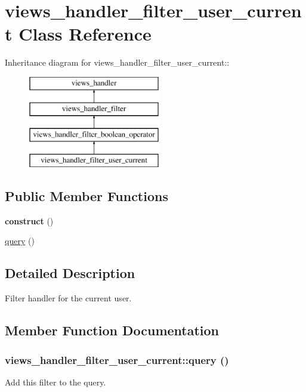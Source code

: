 \hypertarget{classviews__handler__filter__user__current}{
\section{views\_\-handler\_\-filter\_\-user\_\-current Class Reference}
\label{classviews__handler__filter__user__current}
}
Inheritance diagram for views\_\-handler\_\-filter\_\-user\_\-current::\begin{figure}[H]
\begin{center}
\leavevmode
\includegraphics[height=4cm]{classviews__handler__filter__user__current}
\end{center}
\end{figure}
\subsection*{Public Member Functions}
\begin{DoxyCompactItemize}
\item 
\hypertarget{classviews__handler__filter__user__current_a2e747ed7a374f3c16abd60b5065520a9}{
{\bfseries construct} ()}
\label{classviews__handler__filter__user__current_a2e747ed7a374f3c16abd60b5065520a9}

\item 
\hyperlink{classviews__handler__filter__user__current_a6002cf25d2385bd07c771f9a65cee48f}{query} ()
\end{DoxyCompactItemize}


\subsection{Detailed Description}
Filter handler for the current user. 

\subsection{Member Function Documentation}
\hypertarget{classviews__handler__filter__user__current_a6002cf25d2385bd07c771f9a65cee48f}{
\subsubsection[{query}]{\setlength{\rightskip}{0pt plus 5cm}views\_\-handler\_\-filter\_\-user\_\-current::query ()}}
\label{classviews__handler__filter__user__current_a6002cf25d2385bd07c771f9a65cee48f}
Add this filter to the query.

